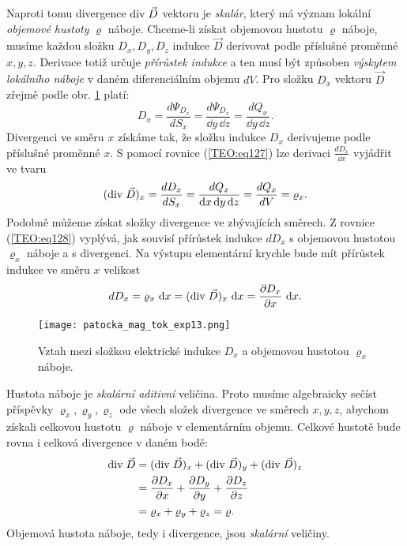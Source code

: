       Naproti tomu divergence \(\mathrm{div}\;\vec{D}\) vektoru je \emph{skalár}, který má význam lokální 
      \emph{objemové hustoty} \(\varrho\) náboje. Chceme-li získat objemovou hustotu \(\varrho\) 
      náboje, musíme každou složku \(D_x, D_y , D_z\) indukce \(\vec{D}\) derivovat podle příslušné 
      proměnné \(x, y, z\). Derivace totiž určuje \emph{přírůstek indukce} a ten musí být způsoben 
      \emph{výskytem lokálního náboje} v daném diferenciálním objemu \(dV\). Pro složku \(D_x\) 
      vektoru \(\vec{D}\) zřejmě podle obr. \ref{es:fig_patocka_mag_tok_exp13} platí:
      \begin{equation}\label{TEO:eq127}
        D_x = \frac{d\Psi_{D_x}}{dS_x} = \frac{d\Psi_{D_x}}{\dd{y}\,\dd{z}} = \frac{dQ_x}{\dd{y}\,\dd{z}}. 
      \end{equation} 
      Divergenci ve směru \(x\) získáme tak, že složku indukce \(D_x\) derivujeme podle příslušné 
      proměnné \(x\). S pomocí rovnice (\ref{TEO:eq127}) lze derivaci \(\frac{dD_x}{\dd{x}}\) 
      vyjádřit ve tvaru
      \begin{equation}\label{TEO:eq128}
        (\mathrm{div}\;\vec{D})_x = \frac{dD_x}{dS_x} = \frac{dQ_x}{\mathop{}\!\mathrm{d}x\mathop{}\!\mathrm{d}y\mathop{}\!\mathrm{d}z} = \frac{dQ_x}{dV} = \varrho_x. 
      \end{equation} 
      Podobně můžeme získat složky divergence ve zbývajících směrech. Z rovnice 
      (\ref{TEO:eq128}) vyplývá, jak souvisí přírůstek indukce \(dD_x\) s objemovou hustotou 
      \(\varrho_x\) náboje a s divergenci. Na výstupu elementární krychle bude mít přírůstek 
      indukce ve směru \(x\) velikost
      \begin{equation*}
        dD_x = \varrho_x\,\mathop{}\!\mathrm{d}x = (\mathrm{div}\;\vec{D})_x\,\mathop{}\!\mathrm{d}x = \dfrac{\partial D_x}{\partial x}\,\mathop{}\!\mathrm{d}x. 
      \end{equation*} 
      \begin{figure}[ht!]
        \centering
        \texttt{[image: patocka\_mag\_tok\_exp13.png]}
        \caption{Vztah mezi složkou elektrické indukce \(D_x\) a objemovou hustotou \(\varrho_x\) 
                 náboje.}
        \label{es:fig_patocka_mag_tok_exp13}
      \end{figure}
      
      Hustota náboje je \emph{skalární aditivní} veličina. Proto musíme algebraicky sečíst 
      příspěvky \(\varrho_x, \varrho_y, \varrho_z\) ode všech složek divergence ve směrech \(x, y, 
      z\), abychom získali celkovou hustotu \(\varrho\) náboje v elementárním objemu. Celkové 
      hustotě bude rovna i celková divergence v daném bodě:
      \begin{align}\label{TEO:eq093}
        \mathrm{div}\;\vec{D} &= (\mathrm{div}\;\vec{D})_x + (\mathrm{div}\;\vec{D})_y + (\mathrm{div}\;\vec{D})_z  \nonumber \\
                  &= \dfrac{\partial D_x}{\partial x} + \dfrac{\partial D_y}{\partial y} + \dfrac{\partial D_z}{\partial z}  \nonumber \\
                  &= \varrho_x + \varrho_y + \varrho_z = \varrho. 
      \end{align} 
      Objemová hustota náboje, tedy i divergence, jsou \emph{skalární} veličiny.
      
